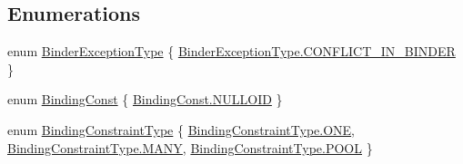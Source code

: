 \subsection*{Enumerations}
\begin{DoxyCompactItemize}
\item 
enum \hyperlink{namespacestrange_1_1framework_1_1api_ae9308e863579d2ca38f2729e1104dac9}{Binder\-Exception\-Type} \{ \hyperlink{namespacestrange_1_1framework_1_1api_ae9308e863579d2ca38f2729e1104dac9a2972874028843b51bde733339d5cf74a}{Binder\-Exception\-Type.\-C\-O\-N\-F\-L\-I\-C\-T\-\_\-\-I\-N\-\_\-\-B\-I\-N\-D\-E\-R}
 \}
\item 
enum \hyperlink{namespacestrange_1_1framework_1_1api_adcc058ca6ff0fe013ffdbf63ada74a97}{Binding\-Const} \{ \hyperlink{namespacestrange_1_1framework_1_1api_adcc058ca6ff0fe013ffdbf63ada74a97a5f32587ea07e2a7ad41b7461e159da30}{Binding\-Const.\-N\-U\-L\-L\-O\-I\-D}
 \}
\item 
enum \hyperlink{namespacestrange_1_1framework_1_1api_a9819c5ab6d03a2cbce2d3dddf5264e42}{Binding\-Constraint\-Type} \{ \hyperlink{namespacestrange_1_1framework_1_1api_a9819c5ab6d03a2cbce2d3dddf5264e42abc21e6484530fc9d0313cb816b733396}{Binding\-Constraint\-Type.\-O\-N\-E}, 
\hyperlink{namespacestrange_1_1framework_1_1api_a9819c5ab6d03a2cbce2d3dddf5264e42a914afc10e7ea496e240a80be1bc01d09}{Binding\-Constraint\-Type.\-M\-A\-N\-Y}, 
\hyperlink{namespacestrange_1_1framework_1_1api_a9819c5ab6d03a2cbce2d3dddf5264e42a3225d08271bdcb752dd48b2a836c8998}{Binding\-Constraint\-Type.\-P\-O\-O\-L}
 \}
\end{DoxyCompactItemize}


